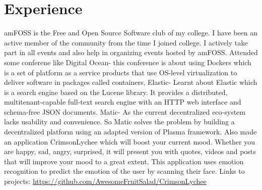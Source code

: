 \documentclass[11pt,a4paper,sans]{moderncv}        %
\begin{document}
\section{Experience}
{amFOSS is the Free and Open Source Software club of my college. I have been an active member of the community from the time I joined college. I actively take part in all events and also help in organizing events hosted by amFOSS.}
{Attended some conferene like Digital Ocean- this conference is about using Dockers which is a set of platform as a service products that use OS-level virtualization to deliver software in packages called containers, Elastic- Learnt about Elastic which is a search engine based on the Lucene library. It provides a distributed, multitenant-capable full-text search engine with an HTTP web interface and schema-free JSON documents. Matic- As the current decentralized eco-system lacks usability and convenience. So Matic solves the problem by building a decentralized platform using an adapted version of Plasma framework. Also made an application CrimsonLychee which will boost your current mood. Whether you are happy, sad, angry, surprised, it will present you with quotes, videos and posts that will improve your mood to a great extent. This application uses emotion recognition to predict the emotion of the user by scanning their face. Links to projects:{\newline} 
\url{https://github.com/AwesomeFruitSalad/CrimsonLychee}}{}  %
\end{document}
